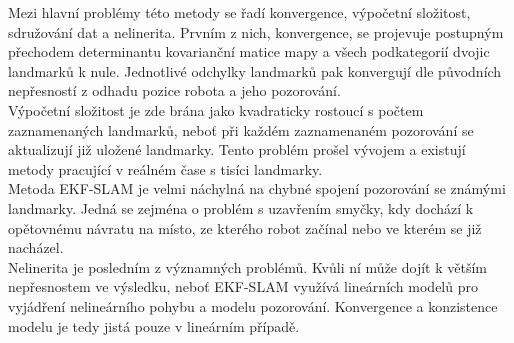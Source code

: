 \documentclass[11pt]{article}
\begin{document}
Mezi hlavní problémy této metody se řadí konvergence, výpočetní složitost, sdružování dat a nelinerita. Prvním z nich, konvergence, se projevuje postupným přechodem determinantu kovarianční matice mapy a všech podkategorií dvojic landmarků k nule. Jednotlivé odchylky landmarků pak konvergují dle původních nepřesností z odhadu pozice robota a jeho pozorování.\\
\indent Výpočetní složitost je zde brána jako kvadraticky rostoucí s počtem zaznamenaných landmarků, neboť při každém zaznamenaném pozorování se aktualizují již uložené landmarky. Tento problém prošel vývojem a existují metody pracující v reálném čase s tisíci landmarky.\\
\indent Metoda EKF-SLAM je velmi náchylná na chybné spojení pozorování se známými landmarky. Jedná se zejména o problém s uzavřením smyčky, kdy dochází k opětovnému návratu na místo, ze kterého robot začínal nebo ve kterém se již nacházel.\\
\indent Nelinerita je posledním z významných problémů. Kvůli ní může dojít k větším nepřesnostem ve výsledku, neboť EKF-SLAM využívá lineárních modelů pro vyjádření nelineárního pohybu a modelu pozorování. Konvergence a konzistence modelu je tedy jistá pouze v lineárním případě. 
\end{document}
